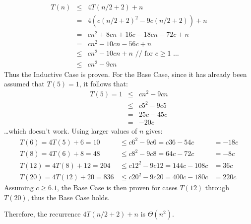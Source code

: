 \begin{eqnarray*}
	T(n) &\leq& 4T(n/2 + 2) + n \\
	 &=& 4(c(n/2 + 2)^2 - 9c(n/2 + 2)) + n \\
	 &=& cn^2 + 8cn + 16c - 18cn - 72c + n \\
	 &=& cn^2 - 10cn - 56c + n \\
	 &\leq& cn^2 - 10cn + n \text{ // for } c \geq 1 \text{ \ldots} \\
	 &\leq& cn^2 - 9cn
\end{eqnarray*}
Thus the Inductive Case is proven.  For the Base Case, since it has already been assumed that $T(5) = 1$, it follows that:
\begin{eqnarray*}
	T(5) = 1 &\leq& cn^2 - 9cn \\
	 &\leq& c5^2 - 9c5 \\
	 &=& 25c - 45c \\
	 &=& -20c
\end{eqnarray*}
\ldots which doesn't work.  Using larger values of $n$ gives:
\begin{eqnarray*}
	T(6) = 4T(5) + 6 = 10 &\leq c6^2 - 9c6 = c36 - 54c &= -18c \\
	T(8) = 4T(6) + 8 = 48 &\leq c8^2 - 9c8 = 64c -72c &= -8c \\
	T(12) = 4T(8) + 12 = 204 &\leq c12^2 - 9c12 = 144c - 108c &= 36c\\
	T(20) = 4T(12) + 20 = 836 &\leq c20^2 - 9c20 = 400c - 180c &= 220c
\end{eqnarray*}
Assuming $c \geq 6.\overline{1}$, the Base Case is then proven for cases $T(12)$ through $T(20)$, thus the Base Case holds.

Therefore, the recurrence $4T(n/2 + 2) + n$ is $\Theta(n^2)$.
